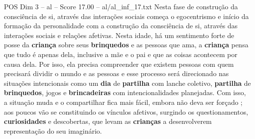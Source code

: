 \begin{textsample}{POS Dim 3 – al – Score 17.00 – al/al\_inf\_17.txt}
Nesta fase de construção da consciência de si, através das interações sociais começa o egocentrismo e início da formação da personalidade com a construção da consciência de si, através das interações sociais e relações afetivas.
Nesta idade, há um sentimento forte de posse da \textbf{criança} sobre seus \textbf{brinquedos} e as pessoas que ama, a \textbf{criança} pensa que tudo é apenas dela, inclusive a mãe e o pai e que as coisas acontecem por causa dela.
Por isso, ela precisa compreender que existem pessoas com quem precisará dividir o mundo e as pessoas e esse processo será direcionado nas situações intencionais como um \textbf{dia} de \textbf{partilha} com lanche coletivo, \textbf{partilha} de \textbf{brinquedos}, jogos e \textbf{brincadeiras} com intencionalidades planejadas.
Com isso, a situação muda e o compartilhar fica mais fácil, embora não deva ser forçado ; aos poucos vão se constituindo os vínculos afetivos, surgindo os questionamentos, \textbf{curiosidades} e descobertas, que levam as \textbf{crianças} a desenvolverem representação do seu imaginário.

\end{textsample}
